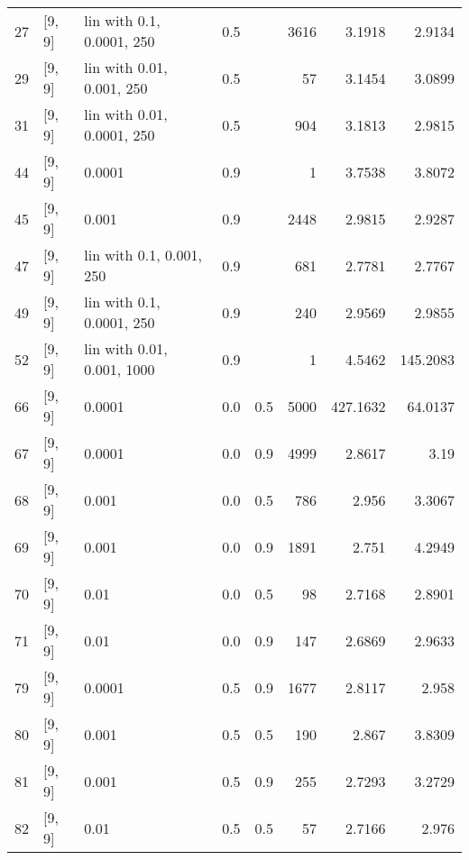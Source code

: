 \begin{longtable}{lllrrrrr}
   27 &             [9, 9] &   lin with 0.1, 0.0001, 250 &      0.5 &     & 3616 &   3.1918 &   2.9134 \\
   29 &             [9, 9] &   lin with 0.01, 0.001, 250 &      0.5 &     &   57 &   3.1454 &   3.0899 \\
   31 &             [9, 9] &  lin with 0.01, 0.0001, 250 &      0.5 &     &  904 &   3.1813 &   2.9815 \\
   44 &             [9, 9] &                      0.0001 &      0.9 &     &    1 &   3.7538 &   3.8072 \\
   45 &             [9, 9] &                       0.001 &      0.9 &     & 2448 &   2.9815 &   2.9287 \\
   47 &             [9, 9] &    lin with 0.1, 0.001, 250 &      0.9 &     &  681 &   2.7781 &   2.7767 \\
   49 &             [9, 9] &   lin with 0.1, 0.0001, 250 &      0.9 &     &  240 &   2.9569 &   2.9855 \\
   52 &             [9, 9] &  lin with 0.01, 0.001, 1000 &      0.9 &     &    1 &   4.5462 & 145.2083 \\
   66 &             [9, 9] &                      0.0001 &      0.0 & 0.5 & 5000 & 427.1632 &  64.0137 \\
   67 &             [9, 9] &                      0.0001 &      0.0 & 0.9 & 4999 &   2.8617 &     3.19 \\
   68 &             [9, 9] &                       0.001 &      0.0 & 0.5 &  786 &    2.956 &   3.3067 \\
   69 &             [9, 9] &                       0.001 &      0.0 & 0.9 & 1891 &    2.751 &   4.2949 \\
   70 &             [9, 9] &                        0.01 &      0.0 & 0.5 &   98 &   2.7168 &   2.8901 \\
   71 &             [9, 9] &                        0.01 &      0.0 & 0.9 &  147 &   2.6869 &   2.9633 \\
   79 &             [9, 9] &                      0.0001 &      0.5 & 0.9 & 1677 &   2.8117 &    2.958 \\
   80 &             [9, 9] &                       0.001 &      0.5 & 0.5 &  190 &    2.867 &   3.8309 \\
   81 &             [9, 9] &                       0.001 &      0.5 & 0.9 &  255 &   2.7293 &   3.2729 \\
   82 &             [9, 9] &                        0.01 &      0.5 & 0.5 &   57 &   2.7166 &    2.976 \\

\end{longtable}
